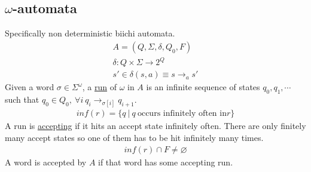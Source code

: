 \documentclass[../598comp.tex]{subfiles}
\begin{document}
\subsection{$\omega$-automata}
Specifically non deterministic biichi automata. 
\begin{gather*}
  A = (Q, \Sigma, \delta, Q_0, F) \\
  \delta : Q \times \Sigma \to 2^Q \\
  s' \in \delta(s, a) \equiv s \to_a s'
\end{gather*}
Given a word $\sigma \in \Sigma^\omega$, a \ul{run} of $\omega$ in $A$ is an
infinite sequence of states $q_0, q_1, \cdots$ such that $q_0 \in Q_0, \ \forall
i \ q_i \to_{\sigma[i]} q_{i + 1}$.
\begin{gather*}
  inf(r) = \{q \ | \ q \ \text{occurs infinitely often in} r\}
\end{gather*}
A run is \ul{accepting} if it hits an accept state infinitely often. There are
only finitely many accept states so one of them has to be hit infinitely many times.
\begin{gather*}
  inf(r) \cap F \neq \varnothing
\end{gather*}
A word is accepted by $A$ if that word has some accepting run.
\end{document}

